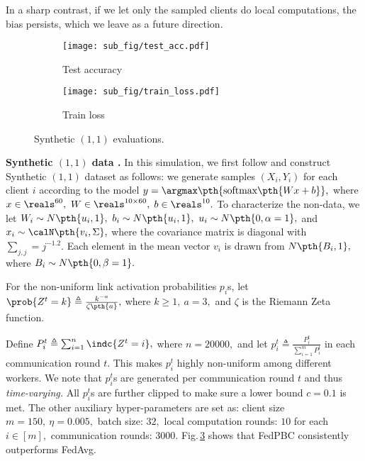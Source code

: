 \documentclass[letterpaper, 10 pt, conference]{ieeeconf}  %
\begin{document}
In a sharp contrast, if we let only the sampled clients do local computations, the bias persists, which we leave as a future direction.
\begin{figure}[!htb]
\begin{subfigure}[b]{0.49\columnwidth}
\centering
\texttt{[image: sub\_fig/test\_acc.pdf]}
\vskip -1pt
\caption{Test accuracy}
\label{fig: test acc}
\end{subfigure}
\begin{subfigure}[b]{0.49\columnwidth}
\centering
\texttt{[image: sub\_fig/train\_loss.pdf]}
\vskip -1pt
\caption{Train loss}
\label{fig: train loss}
\end{subfigure}
\vskip -1pt
\caption{Synthetic $(1,1)$ evaluations.}
\label{fig: synthetic}
\end{figure}
\setlength{\parskip}{0mm}
\newline
{\bf Synthetic $(1,1)$ data .}
In this simulation, we first follow \cite{li2020federated} and construct Synthetic $(1,1)$ dataset as follows: we generate samples $(X_i,Y_i)$ for each client $i$ according to the model $y=\argmax \pth{\text{softmax}\pth{W x + b}},$ where $x\in\reals^{60},$ $W\in\reals^{10\times 60},$ $b\in\reals^{10}.$ 
To characterize the non-\iid data, we let $W_i \sim N\pth{ u_i,1},~b_i\sim N\pth{u_i,1},~u_i\sim N\pth{0,\alpha=1},$ and $x_i\sim \calN\pth{v_i,\Sigma},$ where the covariance matrix is diagonal with $\sum_{j,j}=j^{-1.2}.$
Each element in the mean vector $v_i$ is drawn from $N\pth{B_i,1},$ where $B_i\sim N\pth{0,\beta=1}.$

For the non-uniform link activation probabilities $p_i$s, let
$
\prob{Z^t=k} \triangleq  \frac{k^{-a}}{\zeta\pth{a}},
$
where $k\ge 1,~a = 3,$ and $\zeta$ is the Riemann Zeta function.

Define $P_i^t \triangleq \sum_{i=1}^n \indc{Z^t = i},$
where $n = 20000,$
and let $p_i^t \triangleq \frac{P_i^t}{\sum_{i=1}^m P_i^t}$
in each communication round $t.$ 
This makes $p_i^t$ highly non-uniform among different workers.
We note that $p_i^t$s are generated per communication round $t$ and thus {\it time-varying.}
All $p_i^t$s are further clipped to make sure a lower bound $c=0.1$ is met.
The other auxiliary hyper-parameters are set as:
client size $m=150,~\eta = 0.005,$ batch size: $32,$ local computation rounds: $10$ for each $i\in[m],$ communication rounds: $3000.$
Fig.\,\ref{fig: synthetic} shows that {FedPBC} consistently outperforms {FedAvg}. %
\end{document}

